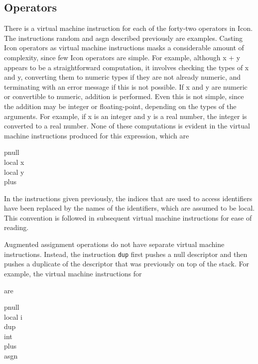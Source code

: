 \subsection{Operators}

There is a virtual machine instruction for each of the forty-two
operators in Icon. The instructions random and asgn described
previously are examples. Casting Icon operators as virtual machine
instructions masks a considerable amount of complexity, since few Icon
operators are simple. For example, although x + y appears to be a
straightforward computation, it involves checking the types of x and
y, converting them to numeric types if they are not already numeric,
and terminating with an error message if this is not possible. If x
and y are numeric or convertible to numeric, addition is
performed. Even this is not simple, since the addition may be integer
or floating-point, depending on the types of the arguments. For
example, if x is an integer and y is a real number, the integer is
converted to a real number. None of these computations is evident in
the virtual machine instructions produced for this expression, which
are

\begin{iconcode}
\>pnull\\
\>local\>\>\> x\\
\>local\>\>\> y\\
\>plus
\end{iconcode}

In the instructions given previously, the indices that are used to
access identifiers have been replaced by the names of the identifiers,
which are assumed to be local. This convention is followed in
subsequent virtual machine instructions for ease of reading.

Augmented assignment operations do not have separate virtual machine
instructions. Instead, the instruction \texttt{dup} first pushes a
null descriptor and then pushes a duplicate of the descriptor that was
previously on top of the stack.  For example, the virtual machine
instructions for


are

\begin{iconcode}
\>pnull\\
\>local\>\>\> i\\
\>dup\\
\>int\>\>\\
\>plus\\
\>asgn
\end{iconcode}

